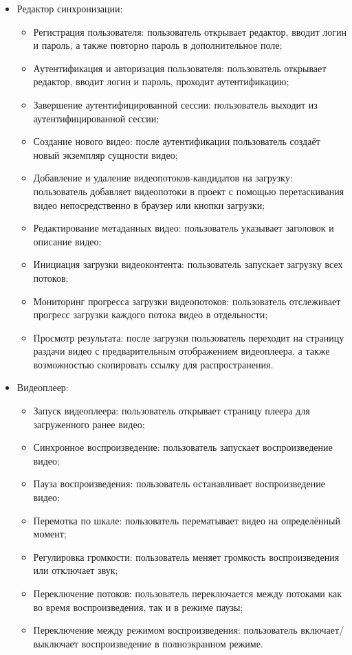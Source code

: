 	\begin{itemize}[label=$\bullet$]
		\item Редактор синхронизации:
		\begin{itemize}[label=$\circ$]
			\item Регистрация пользователя: пользователь открывает редактор, вводит логин и пароль, а также повторно пароль в дополнительное поле;
			\item Аутентификация и авторизация пользователя: пользователь открывает редактор, вводит логин и пароль, проходит аутентификацию;
			\item Завершение аутентифицированной сессии: пользователь выходит из аутентифицированной сессии;
			\item Создание нового видео: после аутентификации пользователь создаёт новый экземпляр сущности видео;
			\item Добавление и удаление видеопотоков-кандидатов на загрузку: пользователь добавляет видеопотоки в проект с помощью перетаскивания видео непосредственно в браузер или кнопки загрузки;
			\item Редактирование метаданных видео: пользователь указывает заголовок и описание видео;
			\item Инициация загрузки видеоконтента: пользователь запускает загрузку всех потоков;
			\item Мониторинг прогресса загрузки видеопотоков: пользователь отслеживает прогресс загрузки каждого потока видео в отдельности;
			\item Просмотр результата: после загрузки пользователь переходит на страницу раздачи видео с предварительным отображением видеоплеера, а также возможностью скопировать ссылку для распространения.
		\end{itemize}
		\item Видеоплеер:
		\begin{itemize}[label=$\circ$]
			\item Запуск видеоплеера: пользователь открывает страницу плеера для загруженного ранее видео;
			\item Синхронное воспроизведение: пользователь запускает воспроизведение видео;
			\item Пауза воспроизведения: пользователь останавливает воспроизведение видео;
			\item Перемотка по шкале: пользователь перематывает видео на определённый момент;
			\item Регулировка громкости: пользователь меняет громкость воспроизведения или отключает звук;
			\item Переключение потоков: пользователь переключается между потоками как во время воспроизведения, так и в режиме паузы;
			\item Переключение между режимом воспроизведения: пользователь включает/выключает воспроизведение в полноэкранном режиме.
		\end{itemize}
	\end{itemize}

